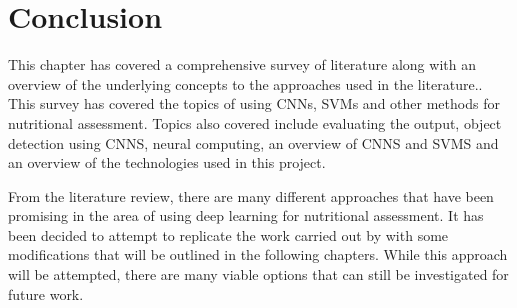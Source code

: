 \section{Conclusion}
This chapter has covered a comprehensive survey of literature along with an overview of the underlying concepts to the approaches used in the literature..
This survey has covered the topics of using CNNs, SVMs and other methods for nutritional assessment.
Topics also covered include evaluating the output, object detection using CNNS, neural computing, an overview of CNNS and SVMS and an overview of the technologies used in this project.

From the literature review, there are many different approaches that have been promising in the area of using deep learning for nutritional assessment.
It has been decided to attempt to replicate the work carried out by \parencite{yanaiFood} with some modifications that will be outlined in the following chapters.
While this approach will be attempted, there are many viable options that can still be investigated for future work.


